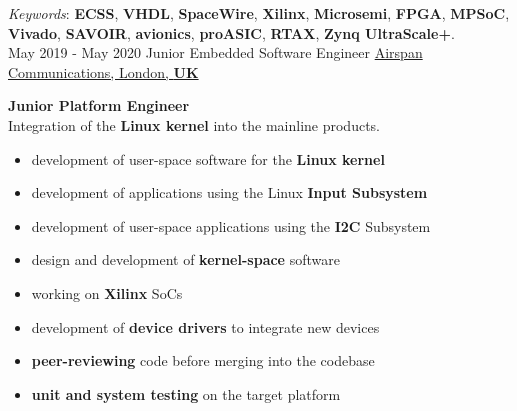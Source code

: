 \documentclass[letterpaper]{twentysecondcv} %
\begin{document}
\begin{twenty}
{            \vspace{1 mm}
            \textit{Keywords}: \textbf{ECSS}, \textbf{VHDL}, \textbf{SpaceWire}, \textbf{Xilinx}, \textbf{Microsemi}, \textbf{FPGA}, \textbf{MPSoC}, \textbf{Vivado}, \textbf{SAVOIR}, \textbf{avionics}, \textbf{proASIC}, \textbf{RTAX}, \textbf{Zynq UltraScale+}.
        }\\
    \twentyitem
    	{May 2019 -}
		{May 2020}
        {Junior Embedded Software Engineer}
        {\href{https://www.airspan.com/}{Airspan Communications, London, \textbf{UK}}}
        {}
        {
            \textbf{Junior Platform Engineer}\\
            Integration of the \textbf{Linux kernel} into the mainline products.
            \vspace{1 mm}
            \begin{itemize}
                \item development of user-space software for the \textbf{Linux kernel}
                \item development of applications using the Linux \textbf{Input Subsystem}
                \item development of user-space applications using the \textbf{I2C} Subsystem
                \item design and development of \textbf{kernel-space} software
                \item working on \textbf{Xilinx} SoCs
                \item development of \textbf{device drivers} to integrate new devices
                \item \textbf{peer-reviewing} code before merging into the codebase
                \item \textbf{unit and system testing} on the target platform
            \end{itemize}

}
\end{twenty}
\end{document}
